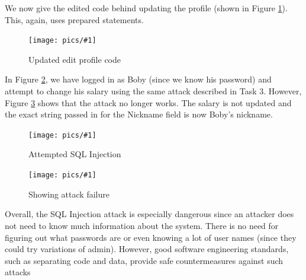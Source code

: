 \documentclass[11pt]{article}
\newcommand{\fig}[2]{ 
\begin{figure}[h]
	\centering
	\caption{#2}
	\texttt{[image: pics/\#1]}
	\label{fig:#1}
\end{figure} 
}
\begin{document}
\newpage

We now give the edited code behind updating the profile (shown in Figure \ref{fig:task4.4}). This, again, uses prepared statements.

\fig{task4.4}{Updated edit profile code}

In Figure \ref{fig:task4.5}, we have logged in as Boby (since we know his password) and attempt to change his salary using the same attack described in Task 3. However, Figure \ref{fig:task4.6} shows that the attack no longer works. The salary is not updated and the exact string passed in for the Nickname field is now Boby's nickname.

\fig{task4.5}{Attempted SQL Injection}

\fig{task4.6}{Showing attack failure}

Overall, the SQL Injection attack is especially dangerous since an attacker does not need to know much information about the system. There is no need for figuring out what passwords are or even knowing a lot of user names (since they could try variations of admin). However, good software engineering standards, such as separating code and data, provide safe countermeasures against such attacks

\newpage 
\end{document}
